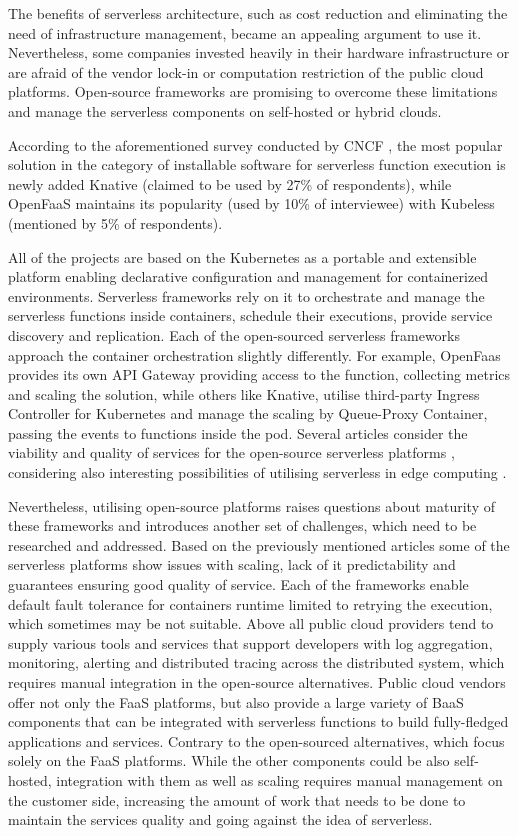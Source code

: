 The benefits of serverless architecture, such as cost reduction and eliminating the need of infrastructure management, became an appealing argument to use it. Nevertheless, some companies invested heavily in their hardware infrastructure or are afraid of the vendor lock-in or computation restriction of the public cloud platforms. Open-source frameworks are promising to overcome these limitations and manage the serverless components on self-hosted or hybrid clouds.

According to the aforementioned survey conducted by CNCF \cite{CNCFServerlessSurvey2020}, the most popular solution in the category of installable software for serverless function execution is newly added Knative (claimed to be used by 27\% of respondents), while OpenFaaS maintains its popularity (used by 10\% of interviewee) with Kubeless (mentioned by 5\% of respondents).

All of the projects are based on the Kubernetes as a portable and extensible platform enabling declarative configuration and management for containerized environments. Serverless frameworks rely on it to orchestrate and manage the serverless functions inside containers, schedule their executions, provide service discovery and replication. Each of the open-sourced serverless frameworks approach the container orchestration slightly differently. For example, OpenFaas provides its own API Gateway providing access to the function, collecting metrics and scaling the solution, while others like Knative, utilise third-party Ingress Controller for Kubernetes and manage the scaling by Queue-Proxy Container, passing the events to functions inside the pod. Several articles consider the viability and quality of services for the open-source serverless platforms \cite{OpenSourceServelessPerformance}, considering also interesting possibilities of utilising serverless in edge computing \cite{OpenSourceServelessEdge}.

Nevertheless, utilising open-source platforms raises questions about maturity of these frameworks and introduces another set of challenges, which need to be researched and addressed. Based on the previously mentioned articles some of the serverless platforms show issues with scaling, lack of it predictability and guarantees ensuring good quality of service. Each of the frameworks enable default fault tolerance for containers runtime limited to retrying the execution, which sometimes may be not suitable. Above all public cloud providers tend to supply various tools and services that support developers with log aggregation, monitoring, alerting and distributed tracing across the distributed system, which requires manual integration in the open-source alternatives. Public cloud vendors offer not only the FaaS platforms, but also provide a large variety of BaaS components that can be integrated with serverless functions to build fully-fledged applications and services. Contrary to the open-sourced alternatives, which focus solely on the FaaS platforms. While the other components could be also self-hosted, integration with them as well as scaling requires manual management on the customer side, increasing the amount of work that needs to be done to maintain the services quality and going against the idea of serverless.

